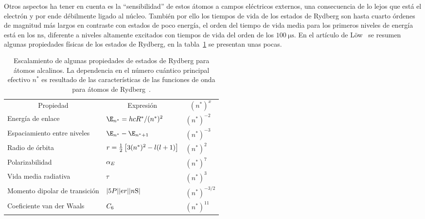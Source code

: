 \p Otros aspectos ha tener en cuenta es la ``sensibilidad'' de estos átomos a campos eléctricos externos, una consecuencia de lo lejos que está el electrón y por ende débilmente ligado al núcleo. También por ello los tiempos de vida de los estados de Rydberg son hasta cuarto órdenes de magnitud más largos en contraste con estados de poco energía, el orden del tiempo de vida media para los primeros niveles de energía está en los $\si{\nano\second}$, diferente a niveles altamente excitados con tiempos de vida del orden de los $\SI{100}{\micro\second}$. En el artículo de Löw~\cite{low} se resumen algunas propiedades físicas de los estados de Rydberg, en la tabla~\ref{tab:propiedadesRydberg} se presentan unas pocas.

\begin{table}[!ht]
\centering
\begin{minipage}{123.5mm}
\centering
\caption[Escalamiento de algunas propiedades de estados de Rydberg para átomos alcalinos]{\label{tab:propiedadesRydberg}Escalamiento de algunas propiedades de estados de Rydberg para átomos alcalinos. La dependencia en el número cuántico principal efectivo $n^{*}$ es resultado de las características de las funciones de onda para átomos de Rydberg~\cite{gallagher,low}.}
\begin{tabular}{*{3}{l}}
\toprule
\multicolumn{1}{c}{Propiedad} & \multicolumn{1}{c}{Expresión} & \multicolumn{1}{c}{$(n^{*})^{x}$}\\
\cmidrule(lr){1-1}\cmidrule(lr){2-2}\cmidrule(lr){3-3}
Energía de enlace & $\E_\sm{n^{*}}=hcR^{*}/(n^{*})^{2}$ & $(n^{*})^{-2}$\\
Espaciamiento entre niveles & $\E_\sm{n^{*}}-\E_\sm{n^{*}+1}$ & $(n^{*})^{-3}$\\
Radio de órbita & $\braket*{r}=\frac{1}{2}\left[3(n^{*})^{2}-l(l+1)\right]$ & $(n^{*})^{2}$\\
Polarizabilidad & $\alpha_{E}$ & $(n^{*})^{7}$\\
Vida media radiativa & $\tau$ & $(n^{*})^{3}$\\
Momento dipolar de transición & $\abs{\braket{5P||er||n\mathrm{S}}}$ & $(n^{*})^{-3/2}$\\
Coeficiente van der Waals & $C_{6}$ & $(n^{*})^{11}$\\
\bottomrule
\end{tabular}
\end{minipage}
\end{table}

